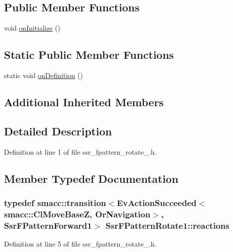 \subsection*{Public Member Functions}
\begin{DoxyCompactItemize}
\item 
void \hyperlink{structSsrFPatternRotate1_aaf280a67edc0719088176780968dbc01}{on\+Initialize} ()
\end{DoxyCompactItemize}
\subsection*{Static Public Member Functions}
\begin{DoxyCompactItemize}
\item 
static void \hyperlink{structSsrFPatternRotate1_a7c51ce804c50c0a9d87736dd94c1a978}{on\+Definition} ()
\end{DoxyCompactItemize}
\subsection*{Additional Inherited Members}


\subsection{Detailed Description}


Definition at line 1 of file ssr\+\_\+fpattern\+\_\+rotate\+\_.\+h.



\subsection{Member Typedef Documentation}
\subsubsection[{\texorpdfstring{reactions}{reactions}}]{\setlength{\rightskip}{0pt plus 5cm}typedef {\bf smacc\+::transition}$<$Ev\+Action\+Succeeded$<${\bf smacc\+::\+Cl\+Move\+BaseZ}, Or\+Navigation$>$, {\bf Ssr\+F\+Pattern\+Forward1}$>$ {\bf Ssr\+F\+Pattern\+Rotate1\+::reactions}}\hypertarget{structSsrFPatternRotate1_a9525313b5aaa3d32678446231617e83e}{}\label{structSsrFPatternRotate1_a9525313b5aaa3d32678446231617e83e}


Definition at line 5 of file ssr\+\_\+fpattern\+\_\+rotate\+\_.\+h.



